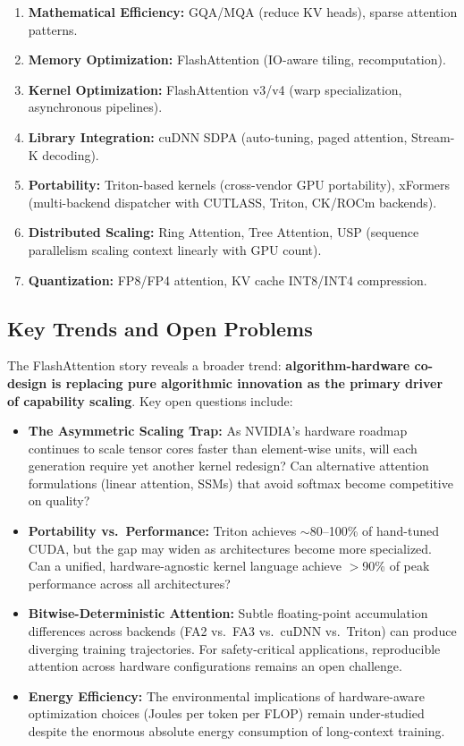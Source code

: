 \documentclass[11pt,a4paper]{article}
\begin{document}
\begin{enumerate}[leftmargin=*, label={\textbf{Layer \arabic*:}}]
    \item \textbf{Mathematical Efficiency:} GQA/MQA (reduce KV heads), sparse attention patterns.
    \item \textbf{Memory Optimization:} FlashAttention (IO-aware tiling, recomputation).
    \item \textbf{Kernel Optimization:} FlashAttention v3/v4 (warp specialization, asynchronous pipelines).
    \item \textbf{Library Integration:} cuDNN SDPA (auto-tuning, paged attention, Stream-K decoding).
    \item \textbf{Portability:} Triton-based kernels (cross-vendor GPU portability), xFormers (multi-backend dispatcher with CUTLASS, Triton, CK/ROCm backends).
    \item \textbf{Distributed Scaling:} Ring Attention, Tree Attention, USP (sequence parallelism scaling context linearly with GPU count).
    \item \textbf{Quantization:} FP8/FP4 attention, KV cache INT8/INT4 compression.
\end{enumerate}

\subsection{Key Trends and Open Problems}

The FlashAttention story reveals a broader trend: \textbf{algorithm-hardware co-design is replacing pure algorithmic innovation as the primary driver of capability scaling}. Key open questions include:

\begin{itemize}[leftmargin=*]
    \item \textbf{The Asymmetric Scaling Trap:} As NVIDIA's hardware roadmap continues to scale tensor cores faster than element-wise units, will each generation require yet another kernel redesign? Can alternative attention formulations (linear attention, SSMs) that avoid softmax become competitive on quality?
    \item \textbf{Portability vs.\ Performance:} Triton achieves $\sim$80--100\% of hand-tuned CUDA, but the gap may widen as architectures become more specialized. Can a unified, hardware-agnostic kernel language achieve $>$90\% of peak performance across all architectures?
    \item \textbf{Bitwise-Deterministic Attention:} Subtle floating-point accumulation differences across backends (FA2 vs.\ FA3 vs.\ cuDNN vs.\ Triton) can produce diverging training trajectories. For safety-critical applications, reproducible attention across hardware configurations remains an open challenge.
    \item \textbf{Energy Efficiency:} The environmental implications of hardware-aware optimization choices (Joules per token per FLOP) remain under-studied despite the enormous absolute energy consumption of long-context training.
\end{itemize}
\end{document}
